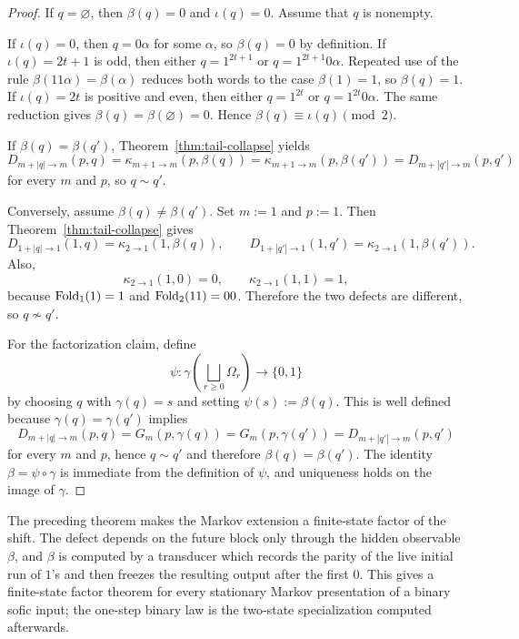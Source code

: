 \begin{proof}
If $q=\varnothing$, then $\beta(q)=0$ and $\iota(q)=0$.  Assume that $q$ is
nonempty.

If $\iota(q)=0$, then $q=0\alpha$ for some $\alpha$, so $\beta(q)=0$ by
definition.  If $\iota(q)=2t+1$ is odd, then either $q=1^{2t+1}$ or
$q=1^{2t+1}0\alpha$.  Repeated use of the rule $\beta(11\alpha)=\beta(\alpha)$
reduces both words to the case $\beta(1)=1$, so $\beta(q)=1$.  If
$\iota(q)=2t$ is positive and even, then either $q=1^{2t}$ or
$q=1^{2t}0\alpha$.  The same reduction gives
$\beta(q)=\beta(\varnothing)=0$.  Hence $\beta(q)\equiv\iota(q)\pmod 2$.

If $\beta(q)=\beta(q')$, Theorem~\ref{thm:tail-collapse} yields
\[
D_{m+|q|\to m}(p,q)
=
\kappa_{m+1\to m}(p,\beta(q))
=
\kappa_{m+1\to m}(p,\beta(q'))
=
D_{m+|q'|\to m}(p,q')
\]
for every $m$ and $p$, so $q\sim q'$.

Conversely, assume $\beta(q)\ne\beta(q')$.  Set $m:=1$ and $p:=1$.  Then
Theorem~\ref{thm:tail-collapse} gives
\[
D_{1+|q|\to 1}(1,q)=\kappa_{2\to 1}(1,\beta(q)),
\qquad
D_{1+|q'|\to 1}(1,q')=\kappa_{2\to 1}(1,\beta(q')).
\]
Also,
\[
\kappa_{2\to 1}(1,0)=0,
\qquad
\kappa_{2\to 1}(1,1)=1,
\]
because $\operatorname{Fold}_1(1)=1$ and $\operatorname{Fold}_2(11)=00$.  Therefore the two defects are
different, so $q\nsim q'$.

For the factorization claim, define
\[
\psi:\gamma\!\left(\bigsqcup_{r\ge 0}\Omega_r\right)\to\{0,1\}
\]
by choosing $q$ with $\gamma(q)=s$ and setting $\psi(s):=\beta(q)$.  This is
well defined because
$\gamma(q)=\gamma(q')$ implies
\[
D_{m+|q|\to m}(p,q)=G_m(p,\gamma(q))=G_m(p,\gamma(q'))=D_{m+|q'|\to m}(p,q')
\]
for every $m$ and $p$, hence $q\sim q'$ and therefore $\beta(q)=\beta(q')$.
The identity $\beta=\psi\circ\gamma$ is immediate from the definition of
$\psi$, and uniqueness holds on the image of $\gamma$.
\end{proof}

The preceding theorem makes the Markov extension a finite-state factor of the
shift.  The defect depends on the future block only through the hidden
observable $\beta$, and $\beta$ is computed by a transducer which records the
parity of the live initial run of $1$'s and then freezes the resulting output
after the first $0$.  This gives a finite-state factor theorem for every
stationary Markov presentation of a binary sofic input; the one-step binary law
is the two-state specialization computed afterwards.

